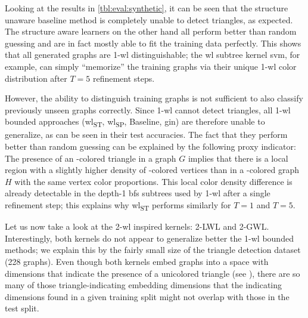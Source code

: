 Looking at the results in \cref{tbl:eval:synthetic}, it can be seen that the structure unaware baseline method is completely unable to detect triangles, as expected.
The structure aware learners on the other hand all perform better than random guessing and are in fact mostly able to fit the training data perfectly.
This shows that all generated graphs are 1-\acs{wl} distinguishable; the \ac{wl} subtree kernel \ac{svm}, for example, can simply ``memorize'' the training graphs via their unique 1-\acs{wl} color distribution after $T = 5$ refinement steps.

However, the ability to distinguish training graphs is not sufficient to also classify previously unseen graphs correctly.
Since 1-\acs{wl} cannot detect triangles, all 1-\acs{wl} bounded approaches (\acs{wl}\textsubscript{ST}, \acs{wl}\textsubscript{SP}, Baseline, \acs{gin}) are therefore unable to generalize, as can be seen in their test accuracies.
The fact that they perform better than random guessing can be explained by the following proxy indicator:
The presence of an -colored triangle in a graph $G$ implies that there is a local region with a slightly higher density of -colored vertices than in a -colored graph $H$ with the same vertex color proportions.
This local color density difference is already detectable in the depth-1 \acs{bfs} subtrees used by 1-\acs{wl} after a single refinement step; this explains why \acs{wl}\textsubscript{ST} performs similarly for $T = 1$ and $T = 5$.

Let us now take a look at the 2-\acs{wl} inspired kernels: 2-LWL and 2-GWL.\@
Interestingly, both kernels do not appear to generalize better the 1-\acs{wl} bounded methods;
we explain this by the fairly small size of the triangle detection dataset (228 graphs).
Even though both kernels embed graphs into a space with dimensions that indicate the presence of a unicolored triangle (see ), there are so many of those triangle-indicating embedding dimensions that the indicating dimensions found in a given training split might not overlap with those in the test split.

